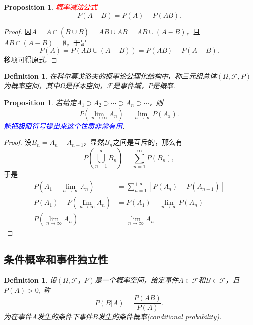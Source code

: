 \documentclass{article}
\newtheorem{proposition}[theorem]{Proposition}
\newtheorem{definition}[theorem]{Definition}
\newcommand{\redt}[1]{\textcolor{red}{#1}}
\newcommand{\bluet}[1]{\textcolor{blue}{#1}}
\begin{document}
\begin{proposition}
\rm \redt{概率减法公式} 
$$
P(A - B) = P(A) - P(AB).
$$
\end{proposition}

\begin{proof}
因$A = A\cap (B \cup \bar{B}) = AB \cup A\bar{B} = AB \cup (A-B)$，且$AB \cap (A-B) = \emptyset$，于是
$$
P(A) = P(AB \cup (A-B)) = P(AB) +
 P(A-B). 
$$
移项可得原式. 
\end{proof}

\begin{definition}
\rm 在科尔莫戈洛夫的概率论公理化结构中，称三元组总体$(\Omega,\mathscr{F}, P)$为{\color{red}概率空间}，其中$\Omega$是样本空间，$\mathscr{F}$是事件域，$P$是概率. 
\end{definition}


\begin{proposition}\label{probability-axiom: lemma1}
\rm 若给定$A_1 \supset A_2 \supset \cdots \supset A_n \supset \cdots$，则
$$
P(\lim\limits_{n \to \infty} A_n) = \lim\limits_{n \to \infty} P(A_n). 
$$
\bluet{能把极限符号提出来这个性质非常有用}. 
\end{proposition}

\begin{proof}
设$B_n = A_n - A_{n+1}$，显然$B_n$之间是互斥的，那么有
$$
P(\bigcup\limits_{n=1}^\infty B_n) = \sum\limits_{n=1}^{\infty} P(B_n),
$$
于是
$$
\begin{array}{rl}
P(A_1-\lim\limits_{n \to \infty} A_n) &=  \sum\limits_{n=1}^{+\infty} \left[P(A_n)-P(A_{n+1})\right] \\
P(A_1)- P(\lim\limits_{n \to \infty} A_n) &= P(A_1) - \lim\limits_{n \to \infty} P(A_n) \\
P(\lim\limits_{n \to \infty} A_n) &= \lim\limits_{n \to \infty} A_n
\end{array}
$$
\end{proof}


\newpage
\subsection{条件概率和事件独立性}

\begin{definition}
\rm 设$(\Omega,\mathscr{F}，P)$是一个概率空间，给定事件$A \in \mathscr{F}$和$B \in \mathscr{F}$，且$P(A) > 0$, 称
$$
P(B|A) = \frac{P(AB)}{P(A)}.
$$
为在事件$A$发生的条件下事件$B$发生的{\color{red}条件概率}(conditional probability).
\end{definition}
\end{document}
